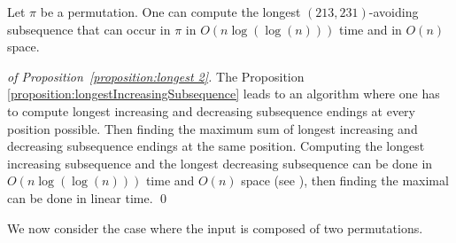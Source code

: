\documentclass[a4paper]{llncs}
\newcounter{num}
\begin{document}
%

\begin{proposition}
\label{proposition:longest 2}
Let $\pi$ be a permutation. One can compute
the longest $(213,231)$-avoiding subsequence that can occur in $\pi$
in $O(n\log(\log(n)))$ time and in $O(n)$ space.
\end{proposition}

\begin{proof}[of Proposition~\ref{proposition:longest 2}]
The Proposition \ref{proposition:longestIncreasingSubsequence} leads to an algorithm
where one has to compute longest increasing and decreasing subsequence endings at every position possible. 
Then finding the maximum sum of longest increasing and decreasing subsequence endings at the same position.
Computing the longest increasing subsequence and the longest decreasing subsequence can be done in 
$O(n\log(\log(n)))$ time and $O(n)$ space 
(see \cite{Bespamyatnikh00enumeratinglongest}), 
then finding the maximal can be done in linear time.
\qed
\end{proof}

We  now consider the case where the input is composed of two permutations.
\end{document}
